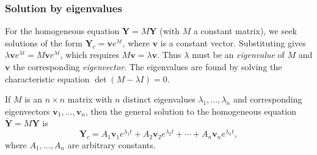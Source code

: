 \documentclass[a4paper]{article}
\begin{document}
\subsubsection{Solution by eigenvalues}
\begin{remark}
  For the homogeneous equation $\dot{\mathbf{Y}} = M\mathbf{Y}$ (with $M$ a constant matrix), we seek solutions of the form $\mathbf{Y}_c = \mathbf{v} e^{\lambda t}$, where $\mathbf{v}$ is a constant vector. Substituting gives $\lambda \mathbf{v} e^{\lambda t} = M\mathbf{v} e^{\lambda t}$, which requires $M\mathbf{v} = \lambda \mathbf{v}$. Thus $\lambda$ must be an \emph{eigenvalue} of $M$ and $\mathbf{v}$ the corresponding \emph{eigenvector}. The eigenvalues are found by solving the characteristic equation $\det(M - \lambda I) = 0$.
\end{remark}

\begin{prop}
  If $M$ is an $n \times n$ matrix with $n$ distinct eigenvalues $\lambda_1, \ldots, \lambda_n$ and corresponding eigenvectors $\mathbf{v}_1, \ldots, \mathbf{v}_n$, then the general solution to the homogeneous equation $\dot{\mathbf{Y}} = M\mathbf{Y}$ is
  \[
    \mathbf{Y}_c = A_1 \mathbf{v}_1 e^{\lambda_1 t} + A_2 \mathbf{v}_2 e^{\lambda_2 t} + \cdots + A_n \mathbf{v}_n e^{\lambda_n t},
  \]
  where $A_1, \ldots, A_n$ are arbitrary constants.
\end{prop}
\end{document}
